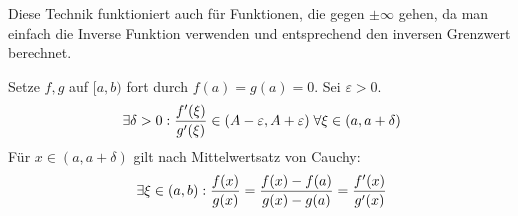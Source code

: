 \documentclass[main.tex]{subfiles}
\begin{document}
\begin{Bemerkung}
  Diese Technik funktioniert auch für Funktionen, die gegen $\pm \infty$ gehen, da man einfach die Inverse Funktion verwenden und entsprechend den inversen Grenzwert berechnet.
\end{Bemerkung}

\begin{Beweis}
  Setze $f,g$ auf $[a,b)$ fort durch $f(a) = g(a) = 0$. Sei $\varepsilon > 0$.
  $$\;\exists \delta > 0 : \dfrac{f'(\xi)}{g'(\xi)} \in (A-\varepsilon, A + \varepsilon) \;\forall \xi \in (a,a+\delta)$$
  Für $x \in (a, a+\delta)$ gilt nach Mittelwertsatz von Cauchy:
  $$\;\exists \xi \in (a,b) : \dfrac{f(x)}{g(x)} = \dfrac{f(x)-f(a)}{g(x)-g(a)} = \dfrac{f'(x)}{g'(x)}$$
\end{Beweis}
\end{document}
